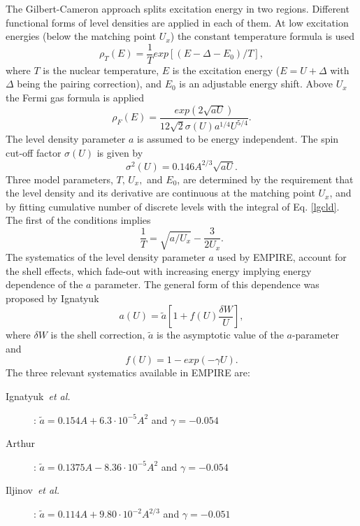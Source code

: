 The Gilbert-Cameron approach \cite{gc} splits excitation energy in two
regions. Different functional forms of level densities%
 are applied in each of them. At low excitation
energies (below the matching point $U_{x}$) the constant temperature formula
is used
\begin{equation}
\rho_{T}(E)=%
\frac{1}{T}exp\left[(E-\Delta-E_{0})/T\right],  \label{lgcld}
\end{equation}
\noindent where $T$ is the nuclear temperature, $E$ is the excitation energy
($E=U+\Delta$ with $\Delta$ being the pairing correction), and $E_{0}$ is an
adjustable energy shift. Above $U_{x}$ the Fermi gas formula is applied
\begin{equation}
\rho_{F}(E)=\frac{exp(2\sqrt{aU})}{12\sqrt{2}\sigma(U)a^{1/4}U^{5/4}}.
\label{ferld}
\end{equation}
The level density parameter $a$ is assumed to be energy independent. The
spin cut-off factor $\sigma(U)$ is given by
\begin{equation}
\sigma^{2}(U)=0.146A^{2/3}\sqrt{aU}.  \label{sigld}
\end{equation}
Three model parameters, $T,\, U_{x},$ and $E_{0}$, are determined by the
requirement that the level density and its derivative are continuous at the
matching point $U_{x}$, and by fitting cumulative number of discrete levels
with the integral of Eq. \ref{lgcld}. The first of the conditions implies
\begin{equation}
\frac{1}{T}=\sqrt{a/U_{x}}-\frac{3}{2U_{x}}.  \label{condUT}
\end{equation}
The systematics of the level density parameter $a$ used by EMPIRE, account
for the shell effects, which fade-out with increasing energy implying energy
dependence of the $a$ parameter. The general form of this dependence was
proposed by Ignatyuk~\cite{ignaa}
\begin{equation}
a(U)=\widetilde{a}[1+f(U)\frac{\delta W}{U}],  \label{apiccoloGC}
\end{equation}
\noindent where $\delta W$ is the shell correction, $\widetilde{a}$ is the
asymptotic value of the $a$-parameter and
\begin{equation}
f(U)=1-exp(-\gamma U).  \label{shellGC}
\end{equation}
The three relevant systematics available in EMPIRE are:

\begin{description}
\item[Ignatyuk~\emph{et al.}~\protect\cite{ignaa}] : $\widetilde{a}%
=0.154A+6.3\cdot10^{-5}A^{2}$ and $\gamma=-0.054$

\item[Arthur~\protect\cite{arthura}] : $\widetilde{a}=0.1375A-8.36%
\cdot10^{-5}A^{2}$ and $\gamma=-0.054$

\item[Iljinov~\emph{et al.}~\protect\cite{Mebel}] : $\widetilde{a}%
=0.114A+9.80\cdot10^{-2}A^{2/3}$ and $\gamma=-0.051$
\end{description}

